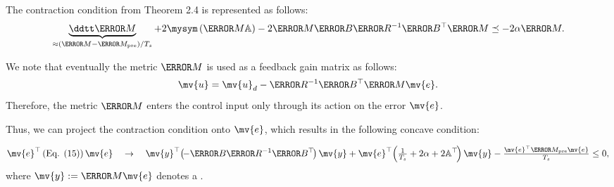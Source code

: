 \begin{frame}{\insertsubsectionhead}{}

  The contraction condition from Theorem 2.4  is represented as follows:
  \begin{equation} \label{eq:cstr:ctrc}
  \underbrace{\ddtt\mm{M}}_{\approx(\mm{M}-\mm{M}_{\rm{pre}})/T_s}
  +
  2\mysym
  \left(
      \mm{M}
      \mathbb{A}
  \right)
  - 
  2
  \mm{M}\mm{B}\mm{R}^{-1}\mm{B}^\top\mm{M}
  \preceq
  -2\alpha \mm{M}
  .
  \end{equation}

  \hfill

  We note that eventually the metric $\mm{M}$ is used as a feedback gain matrix as follows:
  \begin{equation} \label{eq:control:law}
    \mv{u}
    =
    \mv{u}_d
    -
    \mm{R}^{-1} \mm{B}^\top \mm{M}
    \mv{e}
    .
  \end{equation}
  Therefore, the metric $\mm{M}$ enters the control input only through its action on the error $\mv{e}$.

  \hfill

  Thus, we can project the contraction condition onto $\mv{e}$, which results in the following concave condition:

  \begin{equation} \label{eq:cstr:ctrc:proj}
    \mv{e}^\top
    \left(
    \text{Eq. (15)}
    \right)
    \mv{e}
    \quad
    \rightarrow
    \quad
    \mv{y}^\top 
    \!
    \left(
    \!
      -\mm{B} \mm{R}^{-1} \mm{B}^\top
    \!
    \right)
    \mv{y}
    +
    \mv{e}^\top
    \!
    \left(
      \tfrac{1}{T_s}+2\alpha
      +
      2\mathbb{A}^\top
    \!
    \right)
    \mv{y}
    -
    \tfrac{\mv{e}^\top \mm{M}_{\rm{pre}} \mv{e}}{T_s}
    \le 0
    ,
  \end{equation}
  where $\mv{y}:=\mm{M}\mv{e}$ denotes a .

\end{frame}

